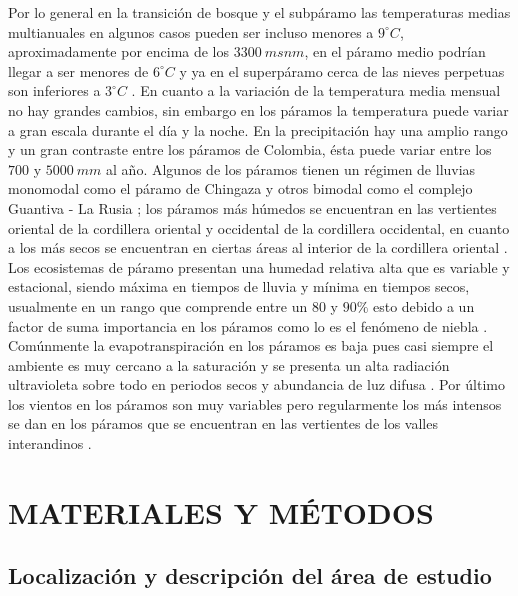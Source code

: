 \documentclass[conference,final,]{IEEEtran}
\begin{document}
Por lo general en la transición de bosque y el subpáramo las
temperaturas medias multianuales en algunos casos pueden ser incluso
menores a \(9^{\circ}C\), aproximadamente por encima de los
\(3300 \ msnm\), en el páramo medio podrían llegar a ser menores de
\(6^{\circ}C\) y ya en el superpáramo cerca de las nieves perpetuas son
inferiores a \(3^{\circ}C\) \cite{morales2019atlas}. En cuanto a la
variación de la temperatura media mensual no hay grandes cambios, sin
embargo en los páramos la temperatura puede variar a gran escala durante
el día y la noche. En la precipitación hay una amplio rango y un gran
contraste entre los páramos de Colombia, ésta puede variar entre los
\(700\) y \(5000 \ mm\) al año. Algunos de los páramos tienen un régimen
de lluvias monomodal como el páramo de Chingaza \cite{morales2019atlas}
y otros bimodal como el complejo Guantiva - La Rusia
\cite{morales2019atlas}; los páramos más húmedos se encuentran en las
vertientes oriental de la cordillera oriental y occidental de la
cordillera occidental, en cuanto a los más secos se encuentran en
ciertas áreas al interior de la cordillera oriental
\cite{morales2019atlas}. Los ecosistemas de páramo presentan una humedad
relativa alta que es variable y estacional, siendo máxima en tiempos de
lluvia y mínima en tiempos secos, usualmente en un rango que comprende
entre un \(80\) y \(90 \%\) esto debido a un factor de suma importancia
en los páramos como lo es el fenómeno de niebla \cite{morales2019atlas}.
Comúnmente la evapotranspiración en los páramos es baja pues casi
siempre el ambiente es muy cercano a la saturación y se presenta un alta
radiación ultravioleta sobre todo en periodos secos y abundancia de luz
difusa \cite{morales2019atlas}. Por último los vientos en los páramos
son muy variables pero regularmente los más intensos se dan en los
páramos que se encuentran en las vertientes de los valles interandinos
\cite{morales2019atlas}.

\hypertarget{materiales-y-muxe9todos}{%
\section{MATERIALES Y MÉTODOS}\label{materiales-y-muxe9todos}}

\hypertarget{localizaciuxf3n-y-descripciuxf3n-del-uxe1rea-de-estudio}{%
\subsection{Localización y descripción del área de
estudio}\label{localizaciuxf3n-y-descripciuxf3n-del-uxe1rea-de-estudio}}
\end{document}
